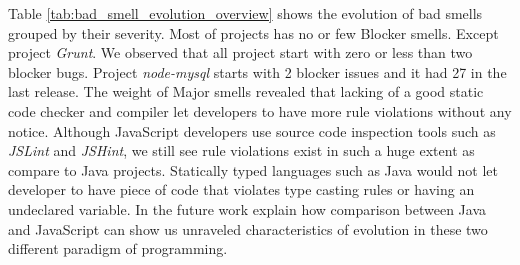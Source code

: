 Table \ref{tab:bad_smell_evolution_overview} shows the evolution of bad smells grouped by their severity. Most of projects has no or few Blocker smells. Except project \textit{Grunt}. We observed that all project start with zero or less than two blocker bugs. Project \textit{node-mysql} starts with 2 blocker issues and it had 27 in the last release. The weight of Major smells revealed that lacking of a good static code checker and compiler let developers to have more rule violations without any notice. Although JavaScript developers use source code inspection tools such as \textit{JSLint} and \textit{JSHint}, we still see rule violations exist in such a huge extent as compare to Java projects. Statically typed languages such as Java would not let developer to have piece of code that violates type casting rules or having an undeclared variable. In the future work explain how comparison between Java and JavaScript can show us unraveled characteristics of evolution in these two different paradigm of programming. 
	
	
	